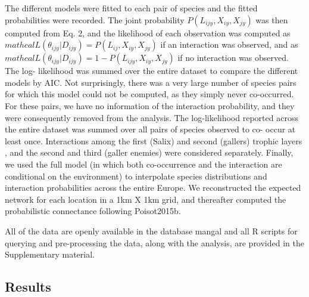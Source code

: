 \documentclass[12pt]{article}
\begin{document}
The different models were fitted to each pair of species and the fitted
probabilities were recorded. The joint probability $P(L_{ijy},X_{iy},X_{jy})$
was then computed from Eq. 2, and the likelihood of each observation was
computed as $mathcal{L}(\theta_{ijy}|D_{ijy})=P(L_{ij},X_{iy},X_{jy})$ if an
interaction was observed, and as
$mathcal{L}(\theta_{ijy}|D_{ijy})=1-P(L_{ijy},X_{iy},X_{jy})$ if no
interaction was observed. The log- likelihood was summed over the entire
dataset to compare the different models by AIC. Not surprisingly, there was a
very large number of species pairs for which this model could not be computed,
as they simply never co-occurred. For these pairs, we have no information of
the interaction probability, and they were consequently removed from the
analysis. The log-likelihood reported across the entire dataset was summed
over all pairs of species observed to co- occur at least once. Interactions
among the first (Salix) and second (gallers) trophic layers , and the second
and third (galler enemies) were considered separately. Finally, we used the
full model (in which both co-occurrence and the interaction are conditional on
the environment) to interpolate species distributions and interaction
probabilities across the entire Europe. We reconstructed the expected network
for each location in a 1km X 1km grid, and thereafter computed the
probabilistic connectance following Poisot2015b.

All of the data are openly available in the database mangal \citep{Poisot2015b} and
all R scripts for querying and pre-processing the data, along with the
analysis, are provided in the Supplementary material.

\subsection*{Results}  
\end{document}

